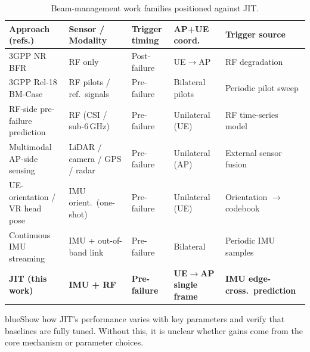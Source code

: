 \documentclass{article}
\newcommand{\blue}[1]{\begin{color}{blue}#1\end{color}}
\begin{document}
\begin{table}[ht]
\centering
\small
\caption{Beam-management work families positioned against JIT.}
\label{tab:reb_relatedwork}
\setlength{\tabcolsep}{4pt}
\renewcommand{\arraystretch}{1.25}
\newcommand{\rgt}[1]{\raggedright\arraybackslash #1}
\begin{tabular}{@{}>{\raggedright\arraybackslash}p{3.5cm} >{\raggedright\arraybackslash}p{2.8cm} >{\raggedright\arraybackslash}p{1.9cm} >{\raggedright\arraybackslash}p{2.5cm} >{\raggedright\arraybackslash}p{2.6cm}@{}}
\toprule
\textbf{Approach (refs.)} & \textbf{Sensor / Modality} & \textbf{Trigger timing} & \textbf{AP+UE coord.} & \textbf{Trigger source} \\
\midrule
3GPP NR BFR~\cite{Giordani2018ATO, Heng2021SixChallenges} &
RF only &
Post-failure &
UE$\rightarrow$AP &
RF degradation \\

3GPP Rel-18 BM-Case~\cite{Alkhateeb2018DLCB, Xue2023Standardization} &
RF pilots / ref.\ signals &
Pre-failure &
Bilateral pilots &
Periodic pilot sweep \\

RF-side pre-failure prediction~\cite{9838772, Alrabeiah2020DeepLearning} &
RF (CSI / sub-6\,GHz) &
Pre-failure &
Unilateral (UE) &
RF time-series model \\

Multimodal AP-side sensing~\cite{Alkhateeb2023DeepSense, Jiang2023LiDAR, Morais2023Position} &
LiDAR / camera / GPS / radar &
Pre-failure &
Unilateral (AP) &
External sensor fusion \\

UE-orientation / VR head pose~\cite{Rezaie2022Orientation, Struye2023CoVRage} &
IMU orient.\ (one-shot) &
Pre-failure &
Unilateral (UE) &
Orientation $\rightarrow$ codebook \\

Continuous IMU streaming~\cite{Brambilla_2019} &
IMU + out-of-band link &
Pre-failure &
Bilateral &
Periodic IMU samples \\

\midrule
\textbf{JIT (this work)} &
\textbf{IMU + RF} &
\textbf{Pre-failure} &
\textbf{UE$\rightarrow$AP single frame} &
\textbf{IMU edge-cross.\ prediction} \\
\bottomrule
\end{tabular}
\end{table}

\begin{tcbremark}
{\selectfont
\blue{Show how JIT's performance varies with key parameters and verify that baselines are fully tuned. Without this, it is unclear whether gains come from the core mechanism or parameter choices.}
}
\end{tcbremark}
\end{document}
